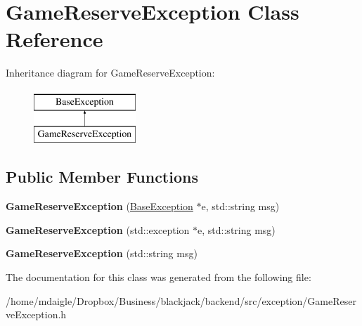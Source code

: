 \hypertarget{classGameReserveException}{
\section{\-Game\-Reserve\-Exception \-Class \-Reference}
\label{classGameReserveException}
}
\-Inheritance diagram for \-Game\-Reserve\-Exception\-:\begin{figure}[H]
\begin{center}
\leavevmode
\includegraphics[height=2.000000cm]{classGameReserveException}
\end{center}
\end{figure}
\subsection*{\-Public \-Member \-Functions}
\begin{DoxyCompactItemize}
\item 
\hypertarget{classGameReserveException_ab63f05de062eb7916e413135018f21bf}{
{\bfseries \-Game\-Reserve\-Exception} (\hyperlink{classBaseException}{\-Base\-Exception} $\ast$e, std\-::string msg)}
\label{classGameReserveException_ab63f05de062eb7916e413135018f21bf}

\item 
\hypertarget{classGameReserveException_ad11f004241da27fca77064a4795d455a}{
{\bfseries \-Game\-Reserve\-Exception} (std\-::exception $\ast$e, std\-::string msg)}
\label{classGameReserveException_ad11f004241da27fca77064a4795d455a}

\item 
\hypertarget{classGameReserveException_a9bbd0c8636bbaf9a318b6797da36f298}{
{\bfseries \-Game\-Reserve\-Exception} (std\-::string msg)}
\label{classGameReserveException_a9bbd0c8636bbaf9a318b6797da36f298}

\end{DoxyCompactItemize}


\-The documentation for this class was generated from the following file\-:\begin{DoxyCompactItemize}
\item 
/home/mdaigle/\-Dropbox/\-Business/blackjack/backend/src/exception/\-Game\-Reserve\-Exception.\-h\end{DoxyCompactItemize}
